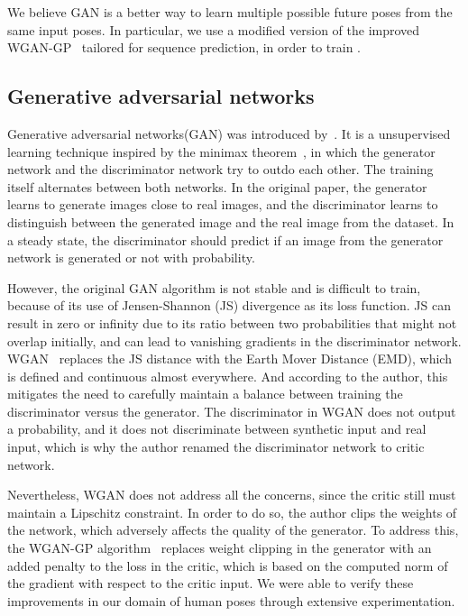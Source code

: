 \documentclass[10pt,twocolumn,letterpaper]{article}
\begin{document}
We believe GAN is a better way to learn multiple possible future poses from the same input poses. In particular, we use a modified version of the improved WGAN-GP~\cite{corr2017:Ishaan} tailored for sequence prediction, in order to train .

\subsection{Generative adversarial networks}

Generative adversarial networks(GAN) was introduced by~\cite{nips2014:Goodfellow}. It is a unsupervised learning technique inspired by the minimax theorem~\cite{pjm1958:Sion}, in which the generator network and the discriminator network try to outdo each other. The training itself alternates between both networks. In the original paper, the generator learns to generate images close to real images, and the discriminator learns to distinguish between the generated image and the real image from the dataset. In a steady state, the discriminator should predict if an image from the generator network is generated or not with  probability.

However, the original GAN algorithm is not stable and is difficult to train, because of its use of Jensen-Shannon (JS) divergence as its loss function. JS can result in zero or infinity due to its ratio between two probabilities that might not overlap initially, and can lead to vanishing gradients in the discriminator network. WGAN~\cite{corr2017:Arjovsky} replaces the JS distance with the Earth Mover Distance (EMD), which is defined and continuous almost everywhere. And according to the author, this mitigates the need to carefully maintain a balance between training the discriminator versus the generator. The discriminator in WGAN does not output a probability, and it does not discriminate between synthetic input and real input, which is why the author renamed the discriminator network to critic network.

Nevertheless, WGAN does not address all the concerns, since the critic still must maintain a Lipschitz constraint. In order to do so, the author clips the weights of the network, which adversely affects the quality of the generator. To address this, the WGAN-GP algorithm~\cite{corr2017:Ishaan} replaces weight clipping in the generator with an added penalty to the loss in the critic, which is based on the computed norm of the gradient with respect to the critic input. We were able to verify these improvements in our domain of human poses through extensive experimentation.
\end{document}
